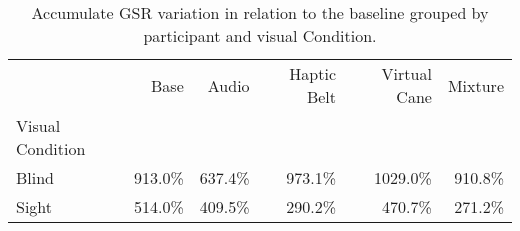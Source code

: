 
\begin{table}[!htb]
\centering
\caption{Accumulate GSR variation in relation to the baseline grouped by participant and visual Condition.}
\label{tab:gsr_var_sum_def}
\begin{tabular}{lrrrrr}
\toprule
{} &     Base &    Audio & Haptic Belt & Virtual Cane &  Mixture \\
Visual Condition &          &          &             &              &          \\
\midrule
Blind            &  913.0\% &  637.4\% &     973.1\% &     1029.0\% &  910.8\% \\
Sight            &  514.0\% &  409.5\% &     290.2\% &      470.7\% &  271.2\% \\
\bottomrule
\end{tabular}
\end{table}


